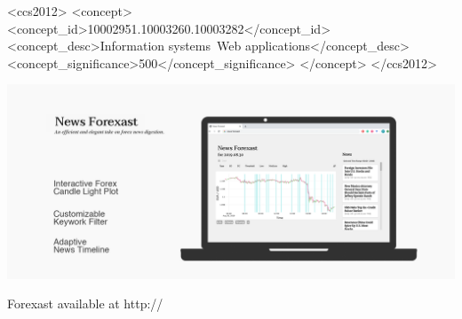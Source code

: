 \documentclass[sigconf]{acmart}
\begin{document}
\begin{CCSXML}
<ccs2012>
   <concept>
       <concept_id>10002951.10003260.10003282</concept_id>
       <concept_desc>Information systems~Web applications</concept_desc>
       <concept_significance>500</concept_significance>
       </concept>
 </ccs2012>
\end{CCSXML}




\begin{teaserfigure}
  \includegraphics[width=\textwidth]{teaser.png}
  \caption{Forexast available at http://}
  \Description{}
  \label{fig:teaser}
\end{teaserfigure}


\maketitle
\end{document}
